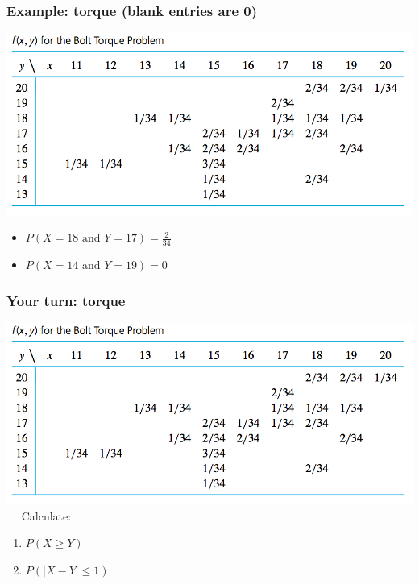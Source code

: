 \documentclass[handout]{beamer}\usepackage[]{graphicx}\usepackage[]{color}
\providecommand{\q}{$\quad$ \newline}
\numberwithin{equation}{section}
\begin{document}
\begin{frame}
\frametitle{Example: torque (blank entries are 0)}
 \includegraphics{../../fig/torquetable.png}
\begin{itemize}
\pause \item $P(X = 18 \text{ and } Y = 17) = \frac{2}{34}$
\pause \item $P(X = 14 \text{ and } Y = 19) = 0$
\end{itemize}
\end{frame}

\begin{frame}
\frametitle{Your turn: torque}
 \includegraphics{../../fig/torquetable.png}\q
Calculate:
\begin{enumerate}[1. ]
\item $P(X \ge Y)$
\item $P(|X-Y| \le 1)$
\end{enumerate}
\end{frame}
\end{document}
